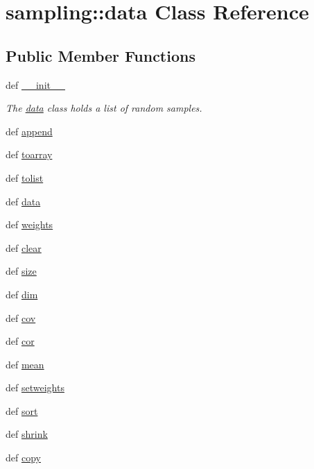 \hypertarget{classsampling_1_1data}{
\section{sampling::data Class Reference}
\label{classsampling_1_1data}
}
\subsection*{Public Member Functions}
\begin{CompactItemize}
\item 
def \hyperlink{classsampling_1_1data_c53c5f40743a4e9972bbea4814133163}{\_\-\_\-init\_\-\_\-}
\begin{CompactList}\small\item\em The \hyperlink{classsampling_1_1data}{data} class holds a list of random samples. \item\end{CompactList}\item 
def \hyperlink{classsampling_1_1data_9276fda7f43c819a4bc405dafba8cb90}{append}
\item 
def \hyperlink{classsampling_1_1data_7e4d9b676ac16687825f8698511904e4}{toarray}
\item 
def \hyperlink{classsampling_1_1data_ca31acb9a3f5ac73c6b578560f1d85c3}{tolist}
\item 
def \hyperlink{classsampling_1_1data_6b0070f25fb05379d9ab4847e6d7d7ca}{data}
\item 
def \hyperlink{classsampling_1_1data_e59799438bbe2136d082d67e95a84afd}{weights}
\item 
def \hyperlink{classsampling_1_1data_c5d34a6d4c38963e9f61fca1fdfb214f}{clear}
\item 
def \hyperlink{classsampling_1_1data_e25008002e4e7869ec5047bf6b6bba36}{size}
\item 
def \hyperlink{classsampling_1_1data_91e88ff11c431b763c1b073fc10ef9cc}{dim}
\item 
def \hyperlink{classsampling_1_1data_036c155076bf9069de078c8fb8102336}{cov}
\item 
def \hyperlink{classsampling_1_1data_0c7353cefc1e45a887f5341455afc3d8}{cor}
\item 
def \hyperlink{classsampling_1_1data_043fedd9515c040a518b9f1571af5e40}{mean}
\item 
def \hyperlink{classsampling_1_1data_ffd8218cbffd08dd6a5943e50dce29fb}{setweights}
\item 
def \hyperlink{classsampling_1_1data_55bd6270b85c5a80aa4a74b0fd2b44cb}{sort}
\item 
def \hyperlink{classsampling_1_1data_97ca284cf4c50daa748273be76f0d18b}{shrink}
\item 
def \hyperlink{classsampling_1_1data_a2b26e86169aedbf74e2f86e24a7b1db}{copy}
\end{CompactItemize}
